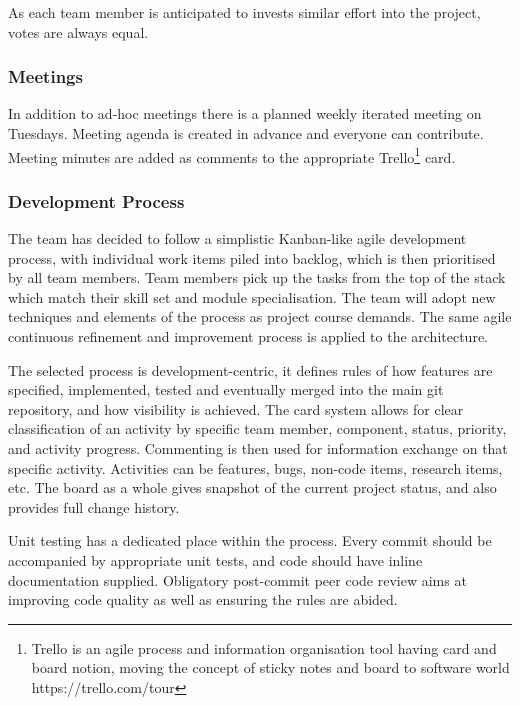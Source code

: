 As each team member is anticipated to invests similar effort into the project, votes are always equal.

\subsubsection{Meetings}
In addition to ad-hoc meetings there is a planned weekly iterated meeting on Tuesdays. Meeting agenda is created in advance and everyone can
contribute. Meeting minutes are added as comments to the appropriate Trello\footnote{Trello is an agile process and information organisation tool having card and board notion, moving the concept of sticky notes and board to software world https://trello.com/tour} card.

\subsubsection{Development Process}

The team has decided to follow a simplistic Kanban-like\cite{Ahmed} agile development process, with individual work items piled into backlog,
which is then prioritised by all team members. Team members pick up the tasks from the top of the stack which match their skill set
and module specialisation. The team will adopt new techniques and elements of the process as project course demands.
The same agile continuous refinement and improvement process is applied to the architecture.

\vspace{2mm}

The selected process is development-centric, it defines rules of how features are specified, implemented, tested and eventually
merged into the main git repository, and how visibility is achieved. The card system allows for clear classification of an activity by specific team member, component, status, priority, and activity progress. Commenting is then used for information exchange on that specific activity. Activities can be features, bugs, non-code items, research items, etc. The board as a whole gives snapshot of the current project status, and also provides full change history.

\vspace{2mm}

Unit testing has a dedicated place within the process. Every commit should be accompanied by appropriate unit tests, and code should have
inline documentation supplied. Obligatory post-commit peer code review aims at improving code quality as well as ensuring the rules are abided.

